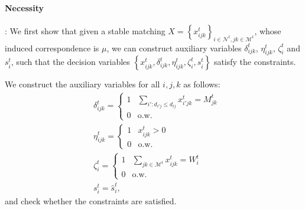 \documentclass[trsc,nonblindrev]{informs3noheader}
\begin{document}
\paragraph{Necessity}: We first show that given a stable matching $X=\left\{x_{ijk}^t\right\}_{i\in\mathcal{N}^t,jk\in \mathcal{M}^t}$, whose induced correspondence is $\mu$, we can construct auxiliary variables $\delta_{ijk}^t$, $\eta_{ijk}^t$, $\zeta_i^t$ and $s_i^t$, such that the decision variables $\left\{x_{ijk}^t,\delta_{ijk}^t, \eta_{ijk}^t, \zeta_i^t, s_i^t\right\}$ satisfy the constraints.

We construct the auxiliary variables for all $i,j,k$ as follows:
\begin{align*}
    & \delta_{ijk}^t = \begin{cases}
        1 & \sum_{i':d_{i'j}\le d_{ij}} x^t_{i'jk} = M_{jk}^t\\
        0 & \text{o.w.}
    \end{cases}\\
    & \eta_{ijk}^t = \begin{cases}
        1 & x_{ijk}^t > 0\\
        0 & \text{o.w.}
    \end{cases}\\
    & \zeta_i^t = \begin{cases}
        1 & \sum_{jk\in \mathcal{M}^t}x_{ijk}^t=W_i^t\\
        0 & \text{o.w.}
    \end{cases}\\
    & s_i^t = \hat{s}_i^t,
\end{align*}
and check whether the constraints are satisfied.
\end{document}
